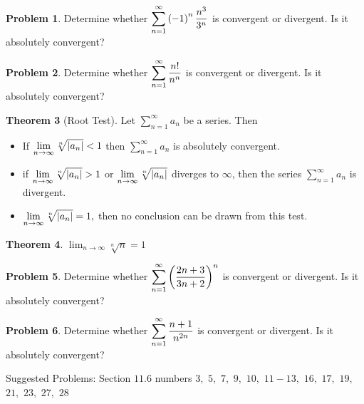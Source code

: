 \documentclass[letterpaper, twoside, 12pt]{book}
\theoremstyle{definition}
\newtheorem{theorem}{Theorem}
\theoremstyle{definition}
\newtheorem{problem}[theorem]{Problem}
\newcommand{\ds}{\ensuremath{\displaystyle}}
\begin{document}
\begin{problem}
 Determine whether $\ds \sum_{n=1}^{\infty} \left(-1\right)^{n} \frac{n^3}{3^n}$ is convergent or divergent. Is it absolutely convergent?
\end{problem}

\vfill

\begin{problem}
 Determine whether $\ds \sum_{n=1}^{\infty} \frac{n!}{n^n}$ is convergent or divergent. Is it absolutely convergent?
\end{problem}

\vfill

\newpage

\begin{theorem}[Root Test]
 Let $\sum_{n=1}^{\infty} a_n$ be a series.  Then
 \begin{itemize}
  \item If $\ds \lim_{n \rightarrow \infty} \sqrt[n]{\left|a_n\right|} < 1$ then $\sum_{n=1}^{\infty} a_n$ is absolutely convergent.
  \item if $\ds \lim_{n \rightarrow \infty} \sqrt[n]{\left|a_n\right|} > 1$ or $\ds \lim_{n \rightarrow \infty} \sqrt[n]{\left|a_n\right|} $ diverges to $ \infty$, then the series $\sum_{n = 1}^{\infty} a_n$ is divergent.
  \item $\ds \lim_{n \rightarrow \infty} \sqrt[n]{\left|a_n\right|} = 1,$ then no conclusion can be drawn from this test.
 \end{itemize}
\end{theorem}

\begin{theorem}
  $\lim_{n\to\infty} \sqrt[n]{n}=1$
\end{theorem}

\begin{problem}
 Determine whether $\ds \sum_{n=1}^{\infty} \left( \frac{2n+3}{3n+2} \right)^n$ is convergent or divergent. Is it absolutely convergent?
\end{problem}

\vfill

\begin{problem}
 Determine whether $\ds \sum_{n=1}^{\infty} \frac{n+1}{n^{2n}}$ is convergent or divergent. Is it absolutely convergent?
\end{problem}

\vfill

\noindent Suggested Problems: Section $11.6$ numbers $3,$ $5,$ $7,$ $9,$ $10,$ $11 - 13,$ $16,$ $17,$ $19,$ $21,$ $23,$ $27,$ $28$
\end{document}
